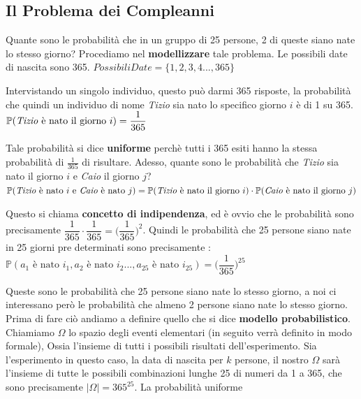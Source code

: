 \documentclass[12pt, letterpaper]{article}
\begin{document}
\subsection{Il Problema dei Compleanni}
Quante sono le probabilità che in un gruppo di 25 persone, 2 di queste siano nate lo stesso giorno? 
Procediamo nel \textbf{modellizzare} tale problema.
Le possibili date di nascita sono 365. 
\centering\(PossibiliDate=\{1,2,3,4...,365\}\)\\
\raggedright Intervistando un singolo individuo, questo può darmi 365 risposte, la probabilità che quindi
un individuo di nome \textit{Tizio} sia nato lo specifico giorno \(i\) è di 1 su 365.\\
\centering\( \mathbb{P}(\text{\textit{Tizio} è nato il giorno } i) = \dfrac{1}{365} \)\\
\raggedright Tale probabilità si dice \textbf{uniforme} perchè tutti i 365 esiti hanno la stessa
probabilità di \(\frac{1}{365}\) di risultare.
Adesso, quante sono le probabilità che \textit{Tizio} sia nato il giorno \(i\) e \textit{Caio}
il giorno \(j\)?\\
\centering\( \mathbb{P}(\text{\textit{Tizio} è nato } i \text{ e \textit{Caio} è nato } j) = \mathbb{P}(\text{\textit{Tizio} è nato il giorno } i) \cdot \mathbb{P}(\text{\textit{Caio} è nato il giorno } j) \)\\
\raggedright Questo si chiama \textbf{concetto di indipendenza}, ed è ovvio che le probabilità sono precisamente \(\dfrac{1}{365}\cdot\dfrac{1}{365} = \bigg( \dfrac{1}{365}\bigg)^2 \).
Quindi le probabilità che 25 persone siano nate in 25 giorni pre determinati sono precisamente : \\
\centering\( \mathbb{P}( a_1 \text{ è nato } i_1,a_2 \text{ è nato } i_2...,a_{25} \text{ è nato } i_{25}) = \bigg( \dfrac{1}{365}\bigg)^{25} \)\\
\raggedright
Queste sono le probabilità che 25 persone siano nate lo stesso giorno, a noi ci interessano però
le probabilità che almeno 2 persone siano nate lo stesso giorno. Prima di fare ciò andiamo a definire
quello che si dice \textbf{modello probabilistico}.\\
Chiamiamo \(\Omega\) lo spazio degli eventi elementari (in seguito verrà definito in modo formale), 
Ossia l'insieme di tutti i possibili risultati dell'esperimento. Sia l'esperimento in questo caso, la 
data di nascita per \(k\) persone, il nostro \(\Omega\)  sarà l'insieme di tutte le possibili combinazioni 
lunghe 25 di  numeri da 1 a 365, che sono precisamente \(|\Omega|=365^{25}\). La probabilità uniforme
\end{document}
